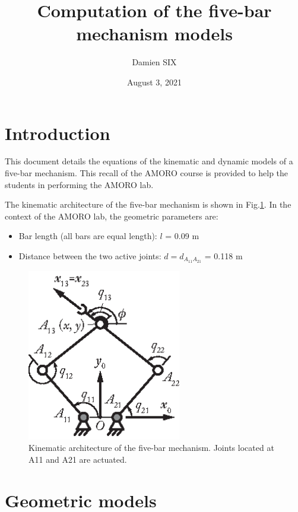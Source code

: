 \documentclass[a4paper]{article}
\title{Computation of the five-bar mechanism models}
\author{Damien SIX}
\date{August 3, 2021}
\begin{document}
\maketitle
\section{Introduction}
This document details the equations of the kinematic and dynamic models of a five-bar mechanism. This recall of the AMORO course is provided to help the students in performing the AMORO lab.

The kinematic architecture of the five-bar mechanism is shown in Fig.\ref{fig:5bar}. In the context of the AMORO lab, the geometric parameters are: 
\begin{itemize}
\item    Bar length (all bars are equal length): $l$ = 0.09 m 
\item    Distance between the two active joints: $d=d_{A_{11}A_{21}}$ = 0.118 m 
\end{itemize}
    
\begin{figure}[h!]
\centering
\includegraphics[width=0.6\textwidth]{RuRRRRu_kin.eps}
\caption{Kinematic architecture of the five-bar mechanism. Joints located at A11 and A21 are actuated.}
\label{fig:5bar}
\end{figure}

\section{Geometric models}
%
\end{document}
